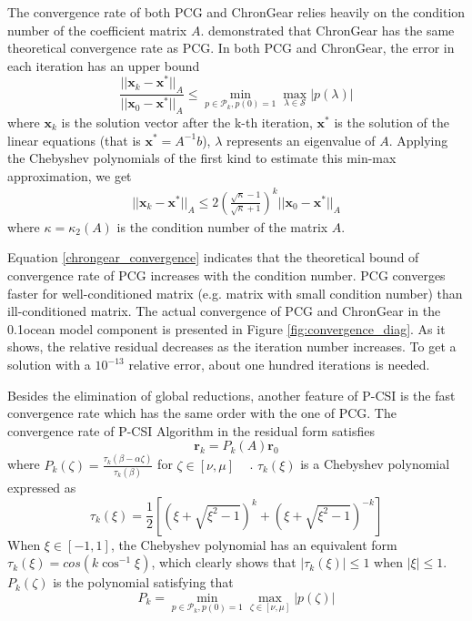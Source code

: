 The convergence rate of both PCG and ChronGear relies heavily on the condition number of the coefficient matrix $A$.
\cite{dAzevedo1999lapack} demonstrated that ChronGear has the same theoretical convergence rate as PCG.
In both PCG and ChronGear, the error in each iteration has an upper bound \citep{Liesen2004}
\begin{equation}
\frac{||\textbf{x}_k-\textbf{x}^*||_A }{||\textbf{x}_0-\textbf{x}^*||_A}  \le \min_{p\in \mathcal{P}_k, p(0) = 1 }\max_{\lambda \in \mathcal{S}} |p(\lambda)| \label{PcgConvergeRate}
\end{equation}
where $\textbf{x}_k$ is the solution vector after the k-th iteration, $\textbf{x}^*$ is the solution of the linear equations (that is $\textbf{x}^* = A^{-1}b$), $\lambda$ represents an eigenvalue of $A$.
Applying the Chebyshev polynomials of the first kind to estimate this min-max approximation, we get
\begin{align}
\label{chrongear_convergence}
||\textbf{x}_k-\textbf{x}^*||_A \le  2 (\frac{\sqrt{\kappa}-1}{\sqrt{\kappa}+1})^k ||\textbf{x}_0-\textbf{x}^*||_A
\end{align}
where   $\kappa =  \kappa_2(A)$ is the condition number of the matrix $A$.

Equation \ref{chrongear_convergence} indicates that the theoretical bound of convergence rate of PCG increases with the condition number.
PCG converges faster for well-conditioned matrix (e.g. matrix with small condition number) than ill-conditioned matrix.
The actual convergence of PCG and ChronGear in the 0.1\degree\space ocean model component  is presented in Figure \ref{fig:convergence_diag}. As it shows, the relative residual decreases as the iteration number increases. To get a solution with a $10^{-13}$ relative error, about one hundred iterations is needed.

Besides the elimination of global reductions, another feature of P-CSI is the fast convergence rate which has the same order with the one of PCG.
The convergence rate of P-CSI Algorithm in the residual form satisfies
\begin{equation}
\textbf{r}_k = P_k(A)\textbf{r}_0 \label{eq:rPjr0}
\end{equation}
where
$P_k(\zeta) = \frac{\tau_k(\beta-\alpha \zeta)}{\tau_k(\beta)}$ for $ \zeta \in [\nu, \mu]$ ~\citep{stiefel1958kernel} .
$\tau_k(\xi)$ is a Chebyshev polynomial expressed as
\begin{equation}
\tau_k(\xi) =   \frac{1}{2}[(\xi+\sqrt{\xi^2-1})^k+(\xi+\sqrt{\xi^2-1})^{-k}]
\end{equation}
When $ \xi \in [-1,1]$, the Chebyshev polynomial has an equivalent form $\tau_k(\xi) = cos(k\cos^{-1} \xi)$, which clearly shows that $|\tau_k(\xi)| \le 1$ when $| \xi | \le 1$. $P_k(\zeta)$ is the polynomial satisfying that
\begin{equation}
P_k = \min_{p\in \mathcal{P}_k, p(0) = 1 }\max_{\zeta \in [\nu,\mu]} |p(\zeta)|
\end{equation}

